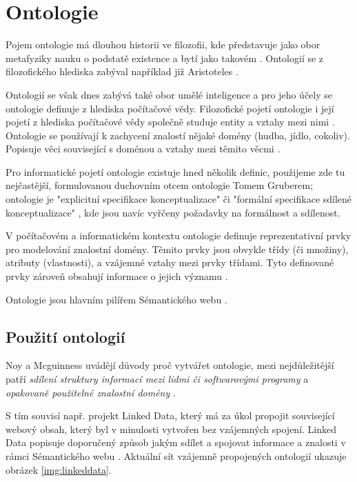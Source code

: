 \chapter{Ontologie}
 
Pojem ontologie má dlouhou historii ve filozofii, kde představuje jako obor metafyziky nauku o podstatě existence a bytí jako takovém \cite{Dictionary}.
Ontologií se z filozofického hlediska zabýval například již Aristoteles \cite{gruber}.

Ontologií se však dnes zabývá také obor umělé inteligence a pro jeho účely se ontologie definuje z hlediska počítačové vědy.
Filozofické pojetí ontologie i její pojetí z hlediska počítačové vědy společně studuje entity a vztahy mezi nimi \cite{kunc}.
Ontologie se používají k zachycení znalostí nějaké domény (hudba, jídlo, cokoliv). Popisuje věci související s doménou a vztahy mezi těmito věcmi \cite{owltutorial}.
    
Pro informatické pojetí ontologie existuje hned několik definic, použijeme zde tu nejčastější, formulovanou duchovním otcem ontologie Tomem Gruberem; 
ontologie je "explicitní specifikace konceptualizace" \cite{gruber} či "formální specifikace sdílené konceptualizace" \cite{ontology}, kde jsou navíc vyřčeny požadavky na formálnost a sdílenost.

V počítačovém a informatickém kontextu ontologie definuje reprezentativní prvky pro modelování znalostní domény. 
Těmito prvky jsou obvykle třídy (či množiny), atributy (vlastnosti), a vzájemné vztahy mezi prvky třídami.
Tyto definované prvky zároveň obsahují informace o jejich významu \cite{gruber}.

Ontologie jsou hlavním pilířem Sémantického webu \cite{ontology}.

\section{Použití ontologií}

Noy a Mcguinness uvádějí důvody proč vytvářet ontologie, mezi nejdůležitější patří \textit{sdílení struktury informací mezi lidmi či softwarovými programy} a \textit{opakovaně použitelné znalostní domény} \cite{noy}.

S tím souvisí např. projekt Linked Data, který má za úkol propojit související webový obsah, který byl v minulosti vytvořen bez vzájemných spojení. Linked Data popisuje doporučený způsob jakým sdílet a spojovat informace a znalosti v rámci Sémantického webu \cite{linkedData}.
Aktuální sít vzájemně propojených ontologií ukazuje obrázek \ref{img:linkeddata}.

